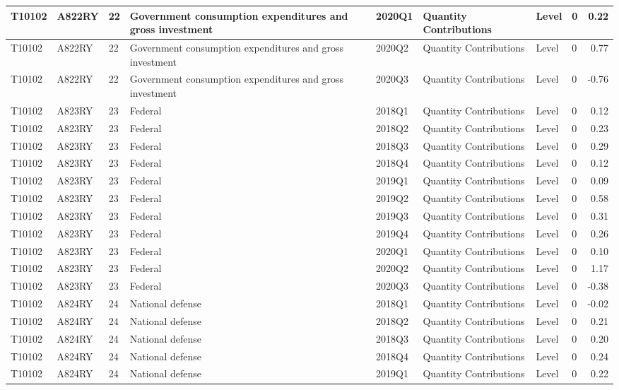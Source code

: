\documentclass[
]{article}
\begin{document}
\begin{tabular}{l|l|l|l|l|l|l|l|r}
\hline
T10102 & A822RY & 22 & Government consumption expenditures and gross investment & 2020Q1 & Quantity Contributions & Level & 0 & 0.22\\
\hline
T10102 & A822RY & 22 & Government consumption expenditures and gross investment & 2020Q2 & Quantity Contributions & Level & 0 & 0.77\\
\hline
T10102 & A822RY & 22 & Government consumption expenditures and gross investment & 2020Q3 & Quantity Contributions & Level & 0 & -0.76\\
\hline
T10102 & A823RY & 23 & Federal & 2018Q1 & Quantity Contributions & Level & 0 & 0.12\\
\hline
T10102 & A823RY & 23 & Federal & 2018Q2 & Quantity Contributions & Level & 0 & 0.23\\
\hline
T10102 & A823RY & 23 & Federal & 2018Q3 & Quantity Contributions & Level & 0 & 0.29\\
\hline
T10102 & A823RY & 23 & Federal & 2018Q4 & Quantity Contributions & Level & 0 & 0.12\\
\hline
T10102 & A823RY & 23 & Federal & 2019Q1 & Quantity Contributions & Level & 0 & 0.09\\
\hline
T10102 & A823RY & 23 & Federal & 2019Q2 & Quantity Contributions & Level & 0 & 0.58\\
\hline
T10102 & A823RY & 23 & Federal & 2019Q3 & Quantity Contributions & Level & 0 & 0.31\\
\hline
T10102 & A823RY & 23 & Federal & 2019Q4 & Quantity Contributions & Level & 0 & 0.26\\
\hline
T10102 & A823RY & 23 & Federal & 2020Q1 & Quantity Contributions & Level & 0 & 0.10\\
\hline
T10102 & A823RY & 23 & Federal & 2020Q2 & Quantity Contributions & Level & 0 & 1.17\\
\hline
T10102 & A823RY & 23 & Federal & 2020Q3 & Quantity Contributions & Level & 0 & -0.38\\
\hline
T10102 & A824RY & 24 & National defense & 2018Q1 & Quantity Contributions & Level & 0 & -0.02\\
\hline
T10102 & A824RY & 24 & National defense & 2018Q2 & Quantity Contributions & Level & 0 & 0.21\\
\hline
T10102 & A824RY & 24 & National defense & 2018Q3 & Quantity Contributions & Level & 0 & 0.20\\
\hline
T10102 & A824RY & 24 & National defense & 2018Q4 & Quantity Contributions & Level & 0 & 0.24\\
\hline
T10102 & A824RY & 24 & National defense & 2019Q1 & Quantity Contributions & Level & 0 & 0.22\\

\end{tabular}
\end{document}
